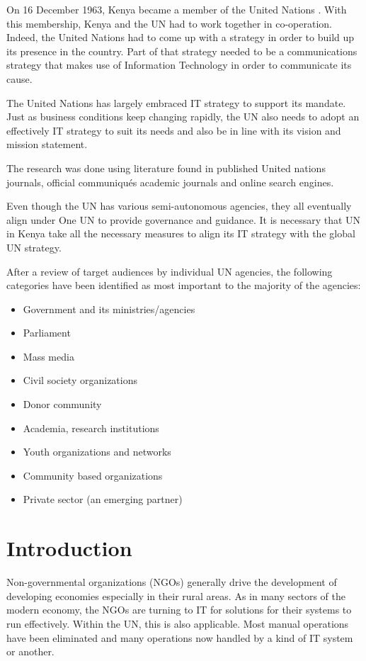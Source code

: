 \documentclass[12pt]{article}
\begin{document}
On 16 December 1963, Kenya became a member of the United Nations \cite{uninkenya}. With this membership, Kenya and the UN had to work together in co-operation. Indeed, the United Nations had to come up with a strategy in order to build up its presence in the country. Part of that strategy needed to be a communications strategy that makes use of Information Technology in order to communicate its cause. 

The United Nations has largely embraced IT strategy to support its mandate. Just as business conditions keep changing rapidly, the UN also needs to adopt an effectively IT strategy to suit its needs and also be in line with its vision and mission statement.

The research was done using literature found in published United nations journals, official communiqu\'es academic journals and online search engines. 

Even though the UN has various semi-autonomous agencies, they all eventually align under One UN to provide governance and guidance. It is necessary that UN in Kenya take all the necessary measures to align its IT strategy with the global UN strategy.

After a review of target audiences by individual UN agencies, the following categories have been identified as most important to the majority of the agencies: \cite{undaf}

\begin{itemize}
\item Government and its ministries/agencies
\item Parliament
\item Mass media
\item Civil society organizations
\item Donor community
\item Academia, research institutions
\item Youth organizations and networks
\item Community based organizations
\item Private sector (an emerging partner)
\end{itemize}

\section*{Introduction}
Non-governmental organizations (NGOs) generally drive the development of developing economies especially in their rural areas. As in many sectors of the modern economy, the NGOs are turning to IT for solutions for their systems to run effectively. Within the UN, this is also applicable. Most manual operations have been eliminated and many operations now handled by a kind of IT system or another. 
\end{document}
